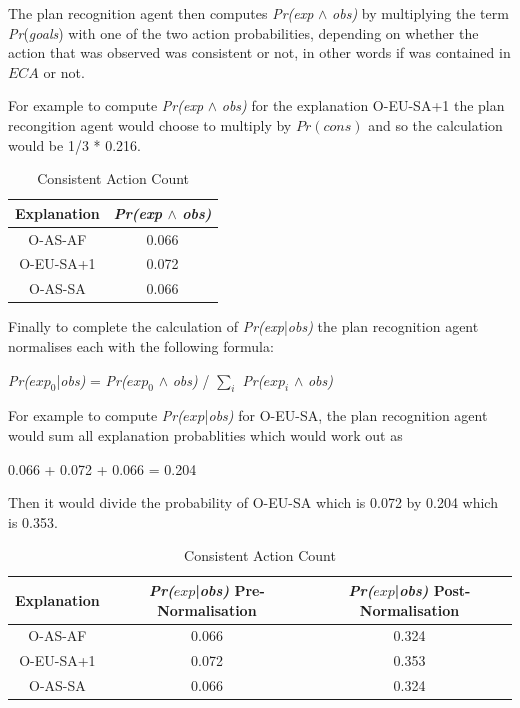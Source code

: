 \documentclass[parskip]{cs4rep}
\begin{document}
The plan recognition agent then computes \textit{Pr(exp} $\wedge$ \textit{obs)} by multiplying the term  \textit{Pr}(\textit{goals}) with one of the two action probabilities, depending on whether the action that was observed was consistent or not, in other words if was contained in $ECA$ or not.

For example to compute \textit{Pr(exp} $\wedge$ \textit{obs)} for the explanation O-EU-SA+1 the plan recongition agent would choose to multiply by $Pr(cons)$ and so the calculation would be 1/3 * 0.216. 

\begin{table}[ht]
\centering
\begin{tabular}{|c|c|}
\hline 
\textbf{Explanation} & \textit{Pr(exp} $\wedge$ \textit{obs)} \\ 
\hline 
O-AS-AF &  0.066 \\ 
\hline 
O-EU-SA+1 &  0.072 \\ 
\hline 
O-AS-SA & 0.066 \\ 
\hline 
\end{tabular}
\caption{Consistent Action Count}
\label{table:territory-actions-bonus}
\end{table}

\newpage

Finally to complete the calculation of \textit{Pr(exp}|\textit{obs)} the plan recognition agent normalises each with the following formula: \newline

\centerline{
\textit{Pr($exp_0$}|\textit{obs)} = \textit{Pr($exp_0$} $\wedge$ \textit{obs)} / $\displaystyle\sum\nolimits_{i}$ \textit{Pr($exp_i$} $\wedge$ \textit{obs)}
}

For example to compute \textit{Pr($exp$}|\textit{obs)} for O-EU-SA, the plan recognition agent would sum all explanation probablities which would work out as 

0.066 + 0.072 + 0.066 = 0.204 

Then it would divide the probability of O-EU-SA which is 0.072 by 0.204 which is 0.353.

\begin{table}[ht]
\centering
\begin{tabular}{|c|c|c|}
\hline 
\textbf{Explanation} &  \textit{Pr($exp$}|\textit{obs)} Pre-Normalisation &  \textit{Pr($exp$}|\textit{obs)} Post-Normalisation \\ 
\hline 
O-AS-AF & 0.066 & 0.324  \\ 
\hline 
O-EU-SA+1 &  0.072 & 0.353 \\ 
\hline 
O-AS-SA & 0.066 & 0.324 \\ 
\hline 
\end{tabular}
\caption{Consistent Action Count}
\label{table:territory-actions-bonus}
\end{table}
\end{document}

